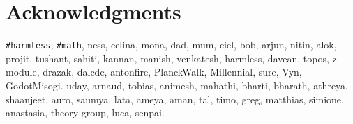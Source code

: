 \documentclass[11pt]{book}
\renewcommand{\baselinestretch}{1.2}
\begin{document}



\newpage
\thispagestyle{empty}
\renewcommand{\thesisdedication}{{\large Copyright \copyright~~Siddharth Bhat, 2021\\}{\large All Rights Reserved\\}}
\thesisdedicationpage



\newpage
\thispagestyle{empty}
\renewcommand{\thesisdedication}{\large To \texttt{\#math} \&\texttt{\#harmless}}
\thesisdedicationpage

\mastersthesis
\renewcommand{\baselinestretch}{1.5}

\chapter*{Acknowledgments}
\label{ch:ack}
\texttt{\#harmless}, \texttt{\#math}, ness, celina, mona, dad, mum, ciel, bob,
arjun, nitin, alok, projit, tushant, sahiti, kannan, manish, venkatesh, 
harmless, davean, topos, z-module, drazak, dalcde, antonfire, PlanckWalk, Millennial, sure,
Vyn, GodotMisogi. uday, arnaud, tobias, animesh, mahathi, bharti, bharath, athreya, shaanjeet, auro, saumya, lata, ameya, aman, tal, timo, greg, matthias, simione, anastasia, theory group, luca, senpai. 


\end{document}
